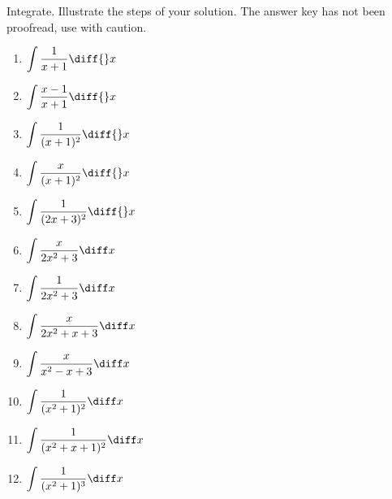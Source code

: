 Integrate. Illustrate the steps of your solution. The answer key has not been proofread, use with caution.
\begin{multicols}{2}
\begin{enumerate}
\item $\displaystyle \int \frac{1}{x+1}\diff {}x$
\item $\displaystyle \int \frac{x-1}{x+1}\diff {}x$


\item $\displaystyle \int \frac{1}{(x+1)^2}\diff {}x$


\item $\displaystyle \int \frac{x}{(x+1)^2}\diff {}x$


\item $\displaystyle \int \frac{1}{(2x+3)^2}\diff {}x$

\item $\displaystyle
\int \frac{x}{ 2x^2+3}\diff x
$

\item $\displaystyle
\int \frac{1}{ 2x^2+3}\diff x
$


\item $\displaystyle
\int \frac{x}{ 2x^2+x+3}\diff x
$

\item $\displaystyle
\int \frac{x}{ x^2-x+3}\diff x
$

\item $\displaystyle
\int \frac{1}{ (x^2+1)^2}\diff x
$
\item $\displaystyle
\int \frac{1}{ (x^2+x+1)^2}\diff x
$
\item $\displaystyle
\int \frac{1}{ (x^2+1)^3}\diff x
$
\end{enumerate}
\end{multicols}
